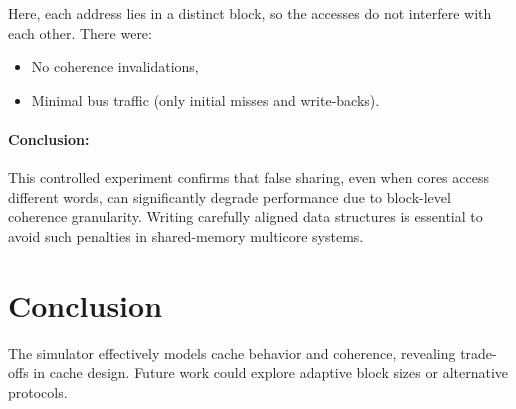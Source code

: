 \documentclass{article}
\begin{document}
Here, each address lies in a distinct block, so the accesses do not interfere with each other. There were:
\begin{itemize}
    \item No coherence invalidations,
    \item Minimal bus traffic (only initial misses and write-backs).
\end{itemize}

\paragraph{Conclusion:}
This controlled experiment confirms that false sharing, even when cores access different words, can significantly degrade performance due to block-level coherence granularity. Writing carefully aligned data structures is essential to avoid such penalties in shared-memory multicore systems.


\section{Conclusion}

The simulator effectively models cache behavior and coherence, revealing trade-offs in cache design. Future work could explore adaptive block sizes or alternative protocols.
\end{document}
